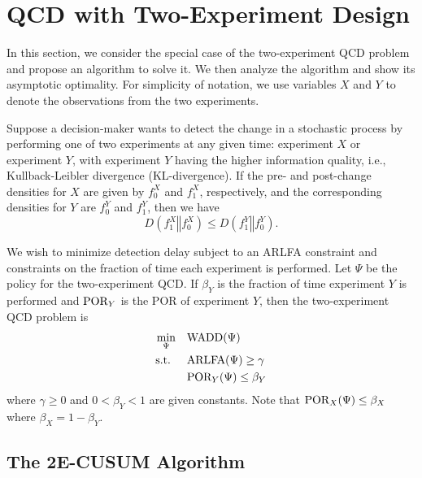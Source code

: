 \documentclass[journal, onecolumn]{IEEEtran}
\begin{document}

\section{QCD with Two-Experiment Design}
\label{sec:two-expt}

In this section, we consider the special case of the two-experiment QCD problem and propose an algorithm to solve it. We then analyze the algorithm and show its asymptotic optimality. For simplicity of notation, we use variables $X$ and $Y$ to denote the observations from the two experiments. 

Suppose a decision-maker wants to detect the change in a stochastic process by performing one of two experiments at any given time: experiment $X$ or experiment $Y$, with experiment $Y$ having the higher information quality, i.e., Kullback-Leibler divergence (KL-divergence). If the pre- and post-change densities for $X$ are given by $f_0^X$ and $f_1^X$, respectively, and the corresponding densities for $Y$ are $f_0^Y$ and $f_1^Y$, then we have
\begin{equation}
D(f_1^X \mathrel{\Vert} f_0^X) \leq D(f_1^Y \mathrel{\Vert} f_0^Y).
\end{equation}

We wish to minimize detection delay subject to an ARLFA constraint and constraints on the fraction of time each experiment is performed. Let $\Psi$ be the policy for the two-experiment QCD. If $\beta_Y$ is the fraction of time experiment $Y$ is performed and $\textup{POR}_Y$ is the POR of experiment $Y$, then the two-experiment QCD problem is
\begin{align}
\begin{split}
\min_{\Psi} \quad & \textup{WADD} (\Psi) \\
\text{s.t. } \quad & \textup{ARLFA} (\Psi) \geq \gamma \\
& \textup{POR}_Y (\Psi) \leq \beta_Y
\end{split}
\label{eq:2e-qcd}
\end{align}
where $\gamma \geq 0$ and $0 < \beta_Y < 1$ are given constants. Note that $\textup{POR}_X (\Psi) \leq \beta_X$ where $\beta_X = 1 - \beta_Y$.




\subsection{The \textup{2E-CUSUM} Algorithm}
\label{sec:2e-cusum}
\end{document}
